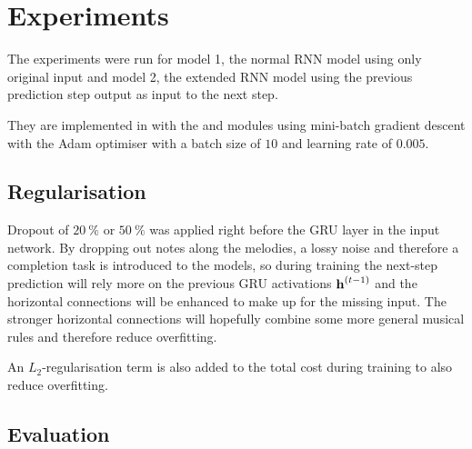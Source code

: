 \section{Experiments}
\label{sec:experiments}


The experiments were run for model 1, the normal RNN model using only original input and model 2, the extended RNN model using the previous prediction step output as input to the next step.

They are implemented in \Python with the \Theano and \Lasagne modules using mini-batch gradient descent with the Adam optimiser \cite{Kingma2014c} with a batch size of $10$ and learning rate of $0.005$.  

\subsection{Regularisation} %
\label{sub:regularization}

Dropout of $\SI{20}{\%}$ or $\SI{50}{\%}$ was applied right before the GRU layer in the input network. By dropping out notes along the melodies, a lossy noise and therefore a completion task is introduced to the models, so during training the next-step prediction will rely more on the previous GRU activations $\bm{\mathrm{h}}^{(t-1)}$ and the horizontal connections will be enhanced to make up for the missing input. The stronger horizontal connections will hopefully combine some more general musical rules and therefore reduce overfitting. 

An $L_2$-regularisation term is also added to the total cost during training to also reduce overfitting.



\subsection{Evaluation}

